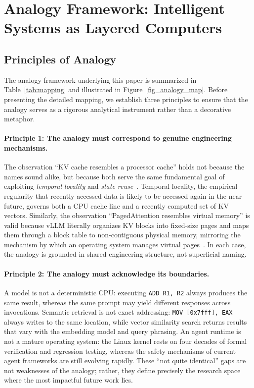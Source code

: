 \section{Analogy Framework: Intelligent Systems as Layered Computers}
\label{sec:framework}

\subsection{Principles of Analogy}

The analogy framework underlying this paper is summarized in Table~\ref{tab:mapping} and illustrated in Figure~\ref{fig_analogy_map}.
Before presenting the detailed mapping, we establish three principles to ensure that the analogy serves as a rigorous analytical instrument rather than a decorative metaphor.

\paragraph{Principle 1: The analogy must correspond to genuine engineering mechanisms.}
The observation ``KV cache resembles a processor cache'' holds not because the names sound alike, but because both serve the same fundamental goal of exploiting \textit{temporal locality} and \textit{state reuse}~\cite{drepper2007memory,kwon2023pagedattention}.
Temporal locality, the empirical regularity that recently accessed data is likely to be accessed again in the near future, governs both a CPU cache line and a recently computed set of KV vectors.
Similarly, the observation ``PagedAttention resembles virtual memory'' is valid because vLLM literally organizes KV blocks into fixed-size pages and maps them through a block table to non-contiguous physical memory, mirroring the mechanism by which an operating system manages virtual pages~\cite{kwon2023pagedattention}.
In each case, the analogy is grounded in shared engineering structure, not superficial naming.

\paragraph{Principle 2: The analogy must acknowledge its boundaries.}
A model is not a deterministic CPU: executing \texttt{ADD R1, R2} always produces the same result, whereas the same prompt may yield different responses across invocations.
Semantic retrieval is not exact addressing: \texttt{MOV [0x7fff], EAX} always writes to the same location, while vector similarity search returns results that vary with the embedding model and query phrasing.
An agent runtime is not a mature operating system: the Linux kernel rests on four decades of formal verification and regression testing, whereas the safety mechanisms of current agent frameworks are still evolving rapidly.
These ``not quite identical'' gaps are not weaknesses of the analogy; rather, they define precisely the research space where the most impactful future work lies.

